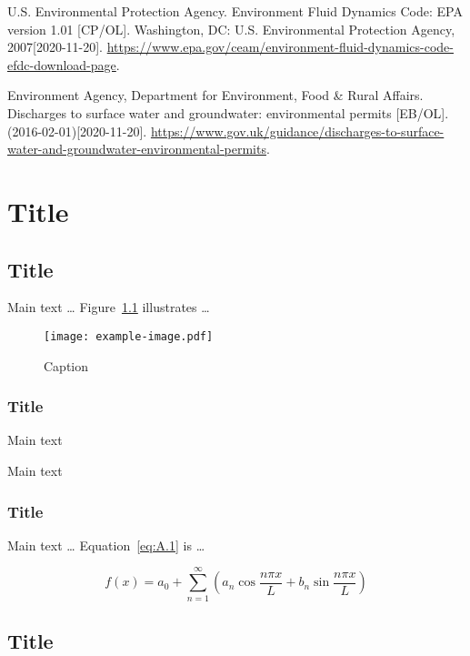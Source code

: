 \documentclass[degree=doctor,language=english]{thuthesis}
\begin{document}
\begin{thebibliography}{9}
   U.S. Environmental Protection Agency. Environment Fluid Dynamics Code: EPA version 1.01 [CP/OL]. Washington, DC: U.S. Environmental Protection Agency, 2007[2020-11-20]. \url{https://www.epa.gov/ceam/environment-fluid-dynamics-code-efdc-download-page}.

   Environment Agency, Department for Environment, Food \& Rural Affairs. Discharges to surface water and groundwater: environmental permits [EB/OL]. (2016-02-01)[2020-11-20]. \url{https://www.gov.uk/guidance/discharges-to-surface-water-and-groundwater-environmental-permits}.

\end{thebibliography}


\appendix

\chapter{Title}

\section{Title}

Main text … Figure~\ref{fig:A.1} illustrates …

\begin{figure}
  \centering
  \texttt{[image: example-image.pdf]}
  \caption{Caption}
  \label{fig:A.1}
\end{figure}

\subsection{Title}

Main text

Main text

\subsection{Title}

Main text … Equation~\eqref{eq:A.1} is …

\begin{equation}
  f(x) = a_0 + \sum_{n=1}^\infty \left( a_n \cos⁡ \frac{n \pi x}{L}
    + b_n \sin⁡ \frac{n \pi x}{L} \right)
  \label{eq:A.1}
\end{equation}

\section{Title}
\end{document}

